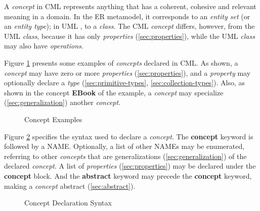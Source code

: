 A \emph{concept} in CML represents anything
that has a coherent, cohesive and relevant meaning in a domain.
In the ER \cite{er} metamodel,
it corresponds to an \emph{entity set} (or an \emph{entity type});
in UML \cite{uml},
to a \emph{class}.
The CML \emph{concept} differs, however, from the UML \emph{class},
because it has only \emph{properties} (\ref{sec:properties}),
while the UML \emph{class} may also have \emph{operations}.

\begin{examples}
Figure \ref{fig:ex:concepts} presents some examples of \emph{concepts} declared in CML.
As shown,
a \emph{concept} may have zero or more \emph{properties}
(\ref{sec:properties}),
and a \emph{property} may optionally declare a \emph{type}
(\ref{sec:primitive-types}, \ref{sec:collection-types}).
Also, as shown in the concept \textbf{EBook} of the example,
a \emph{concept} may specialize
(\ref{sec:generalization})
another \emph{concept}.
\end{examples}

\begin{figure}
\verbatimfont{\small}

\caption{Concept Examples}
\label{fig:ex:concepts}
\end{figure}

\begin{concrete-syntax}
Figure \ref{fig:stx:concept} specifies the syntax used
to declare a \emph{concept}.
The \textbf{concept} keyword is followed by a NAME.
Optionally, a list of other NAMEs may be enumerated,
referring to other \emph{concepts}
that are generalizations (\ref{sec:generalization}) of the declared \emph{concept}.
A list of \emph{properties} (\ref{sec:properties}) may be declared under the \textbf{concept} block.
And the \textbf{abstract} keyword may precede the \textbf{concept} keyword, making a \emph{concept} abstract (\ref{sec:abstract}).
\end{concrete-syntax}

\begin{figure}
\verbatimfont{\small}

\caption{Concept Declaration Syntax}
\label{fig:stx:concept}
\end{figure}

